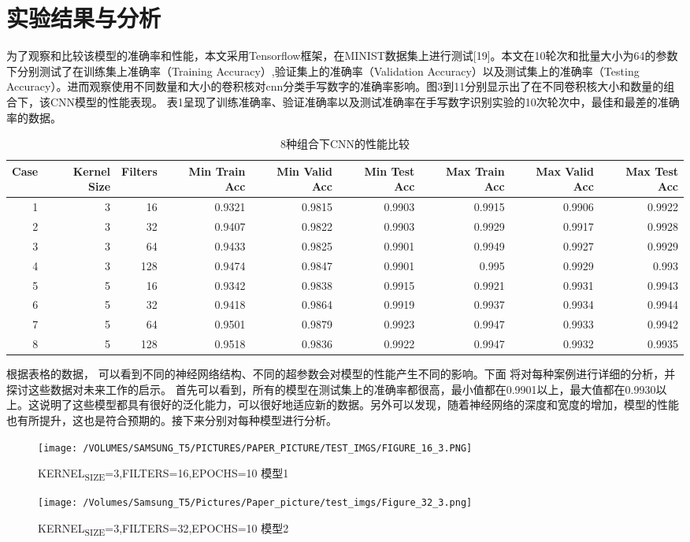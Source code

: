 \documentclass[11pt]{article}
\begin{document}
\section{实验结果与分析}
\label{sec:orgb7bc4ab}
为了观察和比较该模型的准确率和性能，本文采用Tensorflow框架，在MINIST数据集上进行测试[19]。本文在10轮次和批量大小为64的参数下分别测试了在训练集上准确率（Training Accuracy）,验证集上的准确率（Validation Accuracy）以及测试集上的准确率（Testing Accuracy）。进而观察使用不同数量和大小的卷积核对cnn分类手写数字的准确率影响。图3到11分别显示出了在不同卷积核大小和数量的组合下，该CNN模型的性能表现。
表1呈现了训练准确率、验证准确率以及测试准确率在手写数字识别实验的10次轮次中，最佳和最差的准确率的数据。
\begin{table}[htbp]
\caption{8种组合下CNN的性能比较}
\centering
\tiny
\begin{tabular}{rrrrrrrrr}
Case & Kernel Size & Filters & Min Train Acc & Min Valid Acc & Min Test Acc & Max Train Acc & Max Valid Acc & Max Test Acc\\
\hline
1 & 3 & 16 & 0.9321 & 0.9815 & 0.9903 & 0.9915 & 0.9906 & 0.9922\\
2 & 3 & 32 & 0.9407 & 0.9822 & 0.9903 & 0.9929 & 0.9917 & 0.9928\\
3 & 3 & 64 & 0.9433 & 0.9825 & 0.9901 & 0.9949 & 0.9927 & 0.9929\\
4 & 3 & 128 & 0.9474 & 0.9847 & 0.9901 & 0.995 & 0.9929 & 0.993\\
5 & 5 & 16 & 0.9342 & 0.9838 & 0.9915 & 0.9921 & 0.9931 & 0.9943\\
6 & 5 & 32 & 0.9418 & 0.9864 & 0.9919 & 0.9937 & 0.9934 & 0.9944\\
7 & 5 & 64 & 0.9501 & 0.9879 & 0.9923 & 0.9947 & 0.9933 & 0.9942\\
8 & 5 & 128 & 0.9518 & 0.9836 & 0.9922 & 0.9947 & 0.9932 & 0.9935\\
\end{tabular}
\end{table}

根据表格的数据， 可以看到不同的神经网络结构、不同的超参数会对模型的性能产生不同的影响。下面 将对每种案例进行详细的分析，并探讨这些数据对未来工作的启示。
首先可以看到，所有的模型在测试集上的准确率都很高，最小值都在0.9901以上，最大值都在0.9930以上。这说明了这些模型都具有很好的泛化能力，可以很好地适应新的数据。另外可以发现，随着神经网络的深度和宽度的增加，模型的性能也有所提升，这也是符合预期的。接下来分别对每种模型进行分析。
\begin{figure}[htbp]
\centering
\texttt{[image: /VOLUMES/SAMSUNG\_T5/PICTURES/PAPER\_PICTURE/TEST\_IMGS/FIGURE\_16\_3.PNG]}
\caption{KERNEL\textsubscript{SIZE}=3,FILTERS=16,EPOCHS=10 模型1}
\end{figure}
\begin{figure}[htbp]
\centering
\texttt{[image: /Volumes/Samsung\_T5/Pictures/Paper\_picture/test\_imgs/Figure\_32\_3.png]}
\caption{KERNEL\textsubscript{SIZE}=3,FILTERS=32,EPOCHS=10 模型2}
\end{figure}
\end{document}
